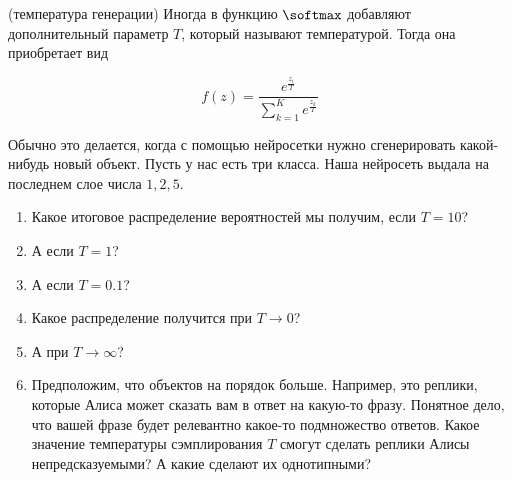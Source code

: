 \begin{problem}{(температура генерации)}
	Иногда в функцию $\softmax$ добавляют дополнительный параметр $T$, который называют температурой. Тогда она приобретает вид 
	
	$$ 
	f(z) =  \frac{e^{\tfrac{z_i}{T}}}{ \sum_{k=1}^K e^{\tfrac{z_k}{T}}}
	$$

	Обычно это делается, когда с помощью нейросетки нужно сгенерировать какой-нибудь новый объект.  Пусть у нас есть три класса. Наша нейросеть выдала на последнем слое числа $1,2,5$. 

	\begin{enumerate}
		\item  Какое итоговое распределение вероятностей мы получим, если $T = 10$? 
		\item  А если $T = 1$? 
		\item  А если $T = 0.1$? 
		\item  Какое распределение получится при $T \to 0$? 
		\item  А при $T \to \infty$? 
		\item  Предположим, что объектов на порядок больше. Например, это реплики, которые Алиса может сказать вам в ответ на какую-то фразу.  Понятное дело, что вашей фразе будет релевантно какое-то подмножество ответов. Какое значение температуры сэмплирования $T$ смогут сделать реплики Алисы непредсказуемыми? А какие сделают их однотипными? 
	\end{enumerate}
\end{problem}

